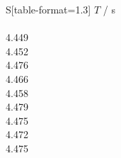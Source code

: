 \begin{subtable}{0.18\textwidth}
\centering
{}
\label{tab:magnet4-5}
\begin{tabular}{S[table-format=1.3]}
\toprule
{$T$ / s} \\
 \\
4.449 \\
4.452 \\
4.476 \\
4.466 \\
4.458 \\
4.479 \\
4.475 \\
4.472 \\
4.475 \\
\bottomrule
\end{tabular}
\end{subtable}
